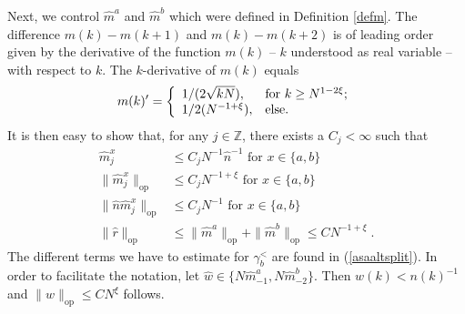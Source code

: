 \documentclass[11pt, english, american]{article}
\newcommand{\asalt}{\gamma^<_b}
\begin{document}
Next, we control $\widehat{m}^a$ and $\widehat{m}^b$ which were defined in Definition \ref{defm}.
The difference $m(k)-m(k+1)$ and
$m(k)-m(k+2)$ is of leading order given by the derivative of the function $m(k)$ -- $k$ understood as real variable --
with respect to $k$.
The $k$-derivative of $m(k)$ equals
\begin{equation}\label{mprime}m(k)^\prime=\left\{
         \begin{array}{ll}
           1/(2\sqrt{kN}), & \hbox{for $k\geq N^{1-2\xi}$;} \\
           1/2(N^{-1+\xi}), & \hbox{else.}
         \end{array}
       \right.\end{equation}
It is then easy to show
that, for any $j\in\mathbb{Z}$, there exists a $C_j<\infty$ such that 
\begin{align}\label{estab1}\widehat{m}_j^x&\leq C_jN^{-1} \widehat{n}^{-1}\text{ for }x\in\{a,b\}\\
%
\label{estab}\|\widehat{m}_j^x\|_{\text{op}}&\leq C_jN^{-1+\xi} \text{ for }x\in\{a,b\}
%
\\\label{estabn}\|\widehat{n}\widehat{m}_j^x\|_{\text{op}}&\leq C_jN^{-1} \text{ for }x\in\{a,b\}
%
\\\label{rop}\|\widehat{r}\|_{\text{op}}&\leq \|\widehat{m}^a\|_{\text{op}}+\|\widehat{m}^b\|_{\text{op}}
\leq CN^{-1+\xi}\;.
\end{align}
The different terms we have to estimate for $\asalt$ are found in (\ref{asaaltsplit}). In order to facilitate the notation, let $ \widehat{w} \in \lbrace N \widehat{m}^a_{-1},N \widehat{m}^b_{-2} \rbrace$. Then $w(k) < n(k)^{-1}$ and $\|\widehat{w}\|_{\text{op}}\leq C N^{\xi}$ follows. 
\end{document}
